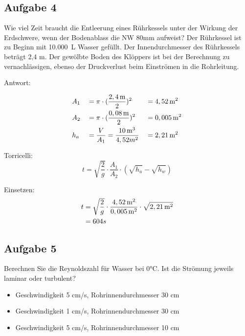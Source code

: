 \documentclass[a4paper,10pt]{article}
\newcommand{\answ}{{\color{miugray2}Antwort: \par \vspace*{-3mm} 
\hrulefill }\par }
\begin{document}
\pagebreak
\subsection*{Aufgabe 4}
Wie viel Zeit braucht die Entleerung eines Rührkessels unter der Wirkung der \mbox{Erdschwere}, wenn der Bodenablass die NW 80mm aufweist? Der Rührkessel ist zu Beginn mit \mbox{10.000 L} Wasser gefüllt. Der Innendurchmesser des Rührkessels beträgt 2,4 m. Der gewölbte Boden des Klöppers ist bei der Berechnung zu vernachlässigen, ebenso der Druckverlust beim Einströmen in die Rohrleitung.
\ppbig
\answ


\begin{align*}
&A_1 &&= \pi \cdot (\frac{2,4\mskip3mu \text{m}}{2})^2 &&= 4,52\mskip3mu \text{m}^2 \\
&A_2 &&= \pi \cdot (\frac{0,08\mskip3mu \text{m}}{2})^2 &&= 0,005\mskip3mu \text{m}^2 \\
&h_a &&= \frac{V}{A_1} = \frac{10\mskip3mu \text{m}^3}{4,52m^2} &&= 2,21\mskip3mu \text{m}^2 
\end{align*}

\ppbig
Torricelli:
\begin{equation}
t = \sqrt{\frac{2}{g}} \cdot \frac{A_1}{A_2} \cdot (\sqrt{h_a} - \sqrt{h_w})
\end{equation}

Einsetzen:
\begin{align*}
t &= \sqrt{\frac{2}{g}} \cdot \frac{4,52\mskip3mu \text{m}^2}{0,005\mskip3mu \text{m}^2} \cdot \sqrt{2,21\mskip3mu \text{m}^2} \\
&= 604s
\end{align*}







\pagebreak
\subsection*{Aufgabe 5}
Berechnen Sie die Reynoldszahl für Wasser bei 0°C. Ist die Strömung jeweils laminar oder turbulent?
\begin{itemize}
       \item[a.] Geschwindigkeit 5 cm/s, Rohrinnendurchmesser 30 cm
       \item[b.] Geschwindigkeit 1 cm/s, Rohrinnendurchmesser 30 cm
       \item[c.] Geschwindigkeit 5 cm/s, Rohrinnendurchmesser 10 cm
\end{itemize}

\ppbig
\end{document}
